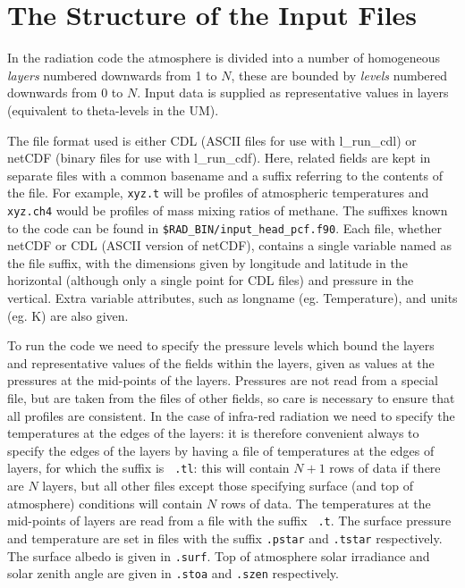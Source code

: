 \section{The Structure of the Input Files}

In the radiation code the atmosphere is divided into a number of homogeneous
{\em layers} numbered downwards from 1 to $N$, these are bounded by {\em 
levels} numbered downwards from 0 to $N$. Input data is supplied as 
representative values in layers (equivalent to theta-levels in the UM).

The file format used is either CDL (ASCII files for use with l\_run\_cdl) 
or netCDF (binary files for use with l\_run\_cdf). Here, related fields 
are kept in separate files with a common
basename and a suffix referring to the contents of the file. For example,
{\tt xyz.t} will be profiles of atmospheric temperatures and {\tt xyz.ch4}
would be profiles of mass mixing ratios of methane. The suffixes known
to the code can be found in {\tt \$RAD\_BIN/input\_head\_pcf.f90}. Each file, 
whether netCDF or CDL (ASCII version of netCDF), contains a single variable 
named as the file suffix, with the dimensions given by longitude and latitude 
in the horizontal (although only a single point for CDL files) and pressure 
in the vertical. Extra variable attributes, such as longname (eg. Temperature), and units (eg. K) are also given.

To run the code we need to specify the pressure levels which bound the
layers and representative values of the fields within the layers,
given as values at the pressures at the mid-points of the
layers. Pressures are not read from a special file, but are taken from
the files of other fields, so care is necessary to ensure that all
profiles are consistent. In the case of infra-red radiation we need to
specify the temperatures at the edges of the layers: it is therefore
convenient always to specify the edges of the layers by having a file
of temperatures at the edges of layers, for which the suffix is {\tt
.tl}: this will contain $N+1$ rows of data if there are $N$ layers,
but all other files except those specifying surface (and top of
atmosphere) conditions will contain $N$ rows of data. The temperatures
at the mid-points of layers are  read from a file with the suffix {\tt
.t}. The surface pressure and temperature are set in files with the 
suffix {\tt .pstar} and {\tt .tstar} respectively. The surface albedo is 
given in {\tt .surf}. Top of atmosphere solar irradiance and solar zenith 
angle are given in {\tt .stoa} and {\tt .szen} respectively.

